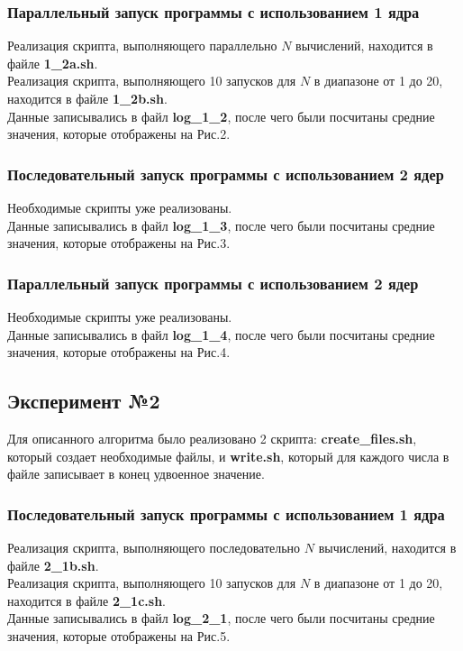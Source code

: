 \documentclass{article}
\begin{document}
\subsubsection*{Параллельный запуск программы с использованием 1 ядра}
Реализация скрипта, выполняющего параллельно $N$ вычислений, находится в файле \textbf{1\_2a.sh}. \\
Реализация скрипта, выполняющего 10 запусков для $N$ в диапазоне от 1 до 20, находится в файле \textbf{1\_2b.sh}. \\
Данные записывались в файл \textbf{log\_1\_2}, после чего были посчитаны средние значения, которые отображены на Рис.2.

\subsubsection*{Последовательный запуск программы с использованием 2 ядер}
Необходимые скрипты уже реализованы. \\
Данные записывались в файл \textbf{log\_1\_3}, после чего были посчитаны средние значения, которые отображены на Рис.3.

\subsubsection*{Параллельный запуск программы с использованием 2 ядер}
Необходимые скрипты уже реализованы. \\
Данные записывались в файл \textbf{log\_1\_4}, после чего были посчитаны средние значения, которые отображены на Рис.4.

\bigskip

\subsection*{Эксперимент №2}
Для описанного алгоритма было реализовано 2 скрипта: \textbf{create\_files.sh}, который создает необходимые файлы, и \textbf{write.sh}, который для каждого числа в файле записывает в конец удвоенное значение.

\subsubsection*{Последовательный запуск программы с использованием 1 ядра}
Реализация скрипта, выполняющего последовательно $N$ вычислений, находится в файле \textbf{2\_1b.sh}. \\
Реализация скрипта, выполняющего 10 запусков для $N$ в диапазоне от 1 до 20, находится в файле \textbf{2\_1c.sh}. \\
Данные записывались в файл \textbf{log\_2\_1}, после чего были посчитаны средние значения, которые отображены на Рис.5.
\end{document}
